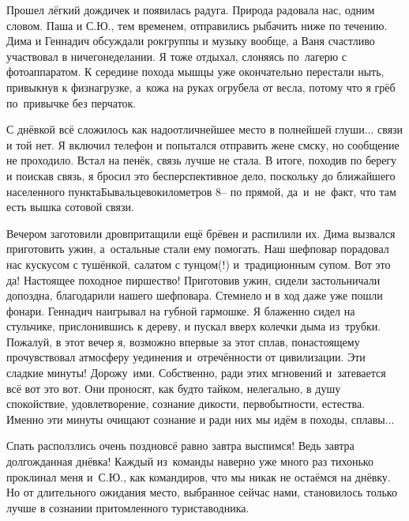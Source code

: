 Прошел лёгкий дождичек и появилась радуга. Природа радовала нас, одним словом. Паша и С.Ю., тем временем, отправились рыбачить ниже по течению. Дима и Геннадич обсуждали рок\sdash группы и музыку вообще, а Ваня счастливо участвовал в ничегонеделании. Я тоже отдыхал, слоняясь по~лагерю с фотоаппаратом. К середине похода мышцы уже окончательно перестали ныть, привыкнув к физнагрузке, а~кожа на руках огрубела от весла, потому что я грёб по~привычке без перчаток. 

С днёвкой всё сложилось как надо\mdash отличнейшее место в полнейшей глуши$\ldots$ связи и той нет. Я включил телефон и попытался отправить жене смску, но сообщение не проходило. Встал на пенёк, связь лучше не стала. В итоге, походив по берегу и поискав связь, я бросил это бесперспективное дело, поскольку до ближайшего населенного пункта\mdash Бывальцево\mdash километров 8\thinspace\nobreakdash-- по прямой, да~и~не~факт, что там есть вышка сотовой связи.

Вечером заготовили дров\mdash притащили ещё брёвен и распилили их. Дима вызвался приготовить ужин, а~остальные стали ему помогать. Наш шеф\sdash повар порадовал нас кус\sdash кусом с тушёнкой, салатом с тунцом(!) и~традиционным супом. Вот это да! Настоящее походное пиршество! Приготовив ужин, сидели застольничали допоздна, благодарили нашего шеф\sdash повара. Стемнело и в ход даже уже пошли фонари. Геннадич наигрывал на губной гармошке. Я блаженно сидел на стульчике, прислонившись к дереву, и пускал вверх колечки дыма из~трубки. Пожалуй, в этот вечер я, возможно впервые за этот сплав, по\sdash настоящему прочувствовал атмосферу уединения и~отречённости от цивилизации. Эти сладкие минуты! Дорожу~ими. Собственно, ради этих мгновений и~затевается всё вот это вот. Они проносят, как будто тайком, нелегально, в душу спокойствие, удовлетворение, сознание дикости, первобытности, естества. Именно эти минуты очищают сознание и ради них мы идём в походы, сплавы$\ldots$ 

Спать расползлись очень поздно\mdash всё равно завтра выспимся! Ведь завтра долгожданная днёвка! Каждый из~команды наверно уже много раз тихонько проклинал меня и~С.Ю., как командиров, что мы никак не остаёмся на днёвку. Но от длительного ожидания место, выбранное сейчас нами, становилось только лучше в сознании притомленного туриста\sdash водника.

\begin{center}
\end{center}
